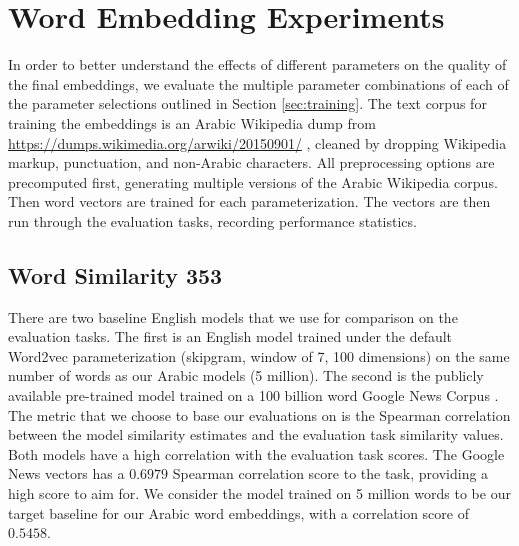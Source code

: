 
\section{Word Embedding Experiments}
\label{sec:experiments}

In order to better understand the effects of different parameters on the quality of the final embeddings, we evaluate the multiple parameter combinations of each of the parameter selections outlined in Section \ref{sec:training}. The text corpus for training the embeddings is an Arabic Wikipedia dump from \url{https://dumps.wikimedia.org/arwiki/20150901/} \cite{wiki:xxx}, cleaned by dropping Wikipedia markup, punctuation, and non-Arabic characters. All preprocessing options are precomputed first, generating multiple versions of the Arabic Wikipedia corpus. Then word vectors are trained for each parameterization. The vectors are then run through the evaluation tasks, recording performance statistics.

\subsection{Word Similarity 353}

There are two baseline English models that we use for comparison on the evaluation tasks. The first is an English model trained under the default Word2vec parameterization (skipgram, window of 7, 100 dimensions) on the same number of words as our Arabic models (5 million). The second is the publicly available pre-trained model trained on a 100 billion word Google News Corpus \cite{mikolovdist:2013}. The metric that we choose to base our evaluations on is the Spearman correlation between the model similarity estimates and the evaluation task similarity values. Both models have a high correlation with the evaluation task scores. The Google News vectors has a $0.6979$ Spearman correlation score to the task, providing a high score to aim for. We consider the model trained on 5 million words to be our target baseline for our Arabic word embeddings, with a correlation score of $0.5458$.

